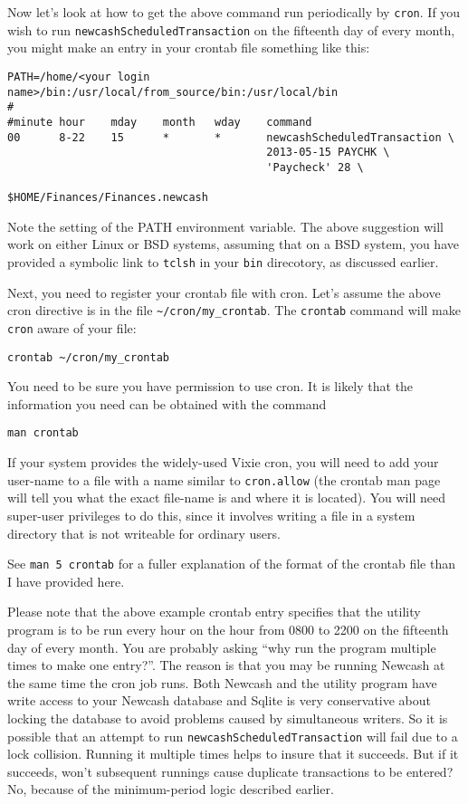 \documentclass{report}
\begin{document}
Now let's look at how to get the above command run periodically by \verb|cron|.  If you wish to run \verb|newcashScheduledTransaction| on the fifteenth day of every month, you might make an entry in your crontab file something like this:

\begin{verbatim}
PATH=/home/<your login name>/bin:/usr/local/from_source/bin:/usr/local/bin
#
#minute	hour	mday	month	wday	command
00      8-22    15      *       *       newcashScheduledTransaction \
                                        2013-05-15 PAYCHK \
                                        'Paycheck' 28 \
                                        $HOME/Finances/Finances.newcash
\end{verbatim}

Note the setting of the PATH environment variable. The above suggestion will work on either Linux or BSD systems, assuming that on a BSD system, you have provided a symbolic link to \verb|tclsh| in your \verb|bin| direcotory, as discussed earlier.

Next, you need to register your crontab file with cron. Let's assume the above cron directive is in the file \verb|~/cron/my_crontab|. The \verb|crontab| command will make \verb|cron| aware of your file:
\begin{verbatim}
crontab ~/cron/my_crontab
\end{verbatim}

You need to be sure you have permission to use cron. It is likely that the information you need can be obtained with the command
\begin{verbatim}
man crontab
\end{verbatim}

If your system provides the widely-used Vixie cron, you will need to add your user-name to a file with a name similar to \verb|cron.allow| (the crontab man page will tell you what the exact file-name is and where it is located). You will need super-user privileges to do this, since it involves writing a file in a system directory that is not writeable for ordinary users.

See \verb|man 5 crontab| for a fuller explanation of the format of the crontab file than I have provided here.

Please note that the above example crontab entry specifies that the utility program is to be run every hour on the hour from 0800 to 2200 on the fifteenth day of every month. You are probably asking ``why run the program multiple times to make one entry?''. The reason is that you may be running Newcash at the same time the cron job runs. Both Newcash and the utility program have write access to your Newcash database and Sqlite is very conservative about locking the database to avoid problems caused by simultaneous writers. So it is possible that an attempt to run \verb|newcashScheduledTransaction| will fail due to a lock collision. Running it multiple times helps to insure that it succeeds. But if it succeeds, won't subsequent runnings cause duplicate transactions to be entered? No, because of the minimum-period logic described earlier.
\end{document}
